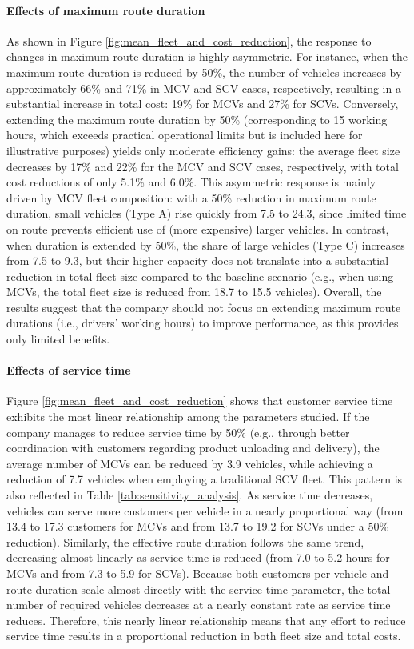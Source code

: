 \documentclass[11pt]{elsarticle}
\theoremstyle{plain}
\begin{document}
\paragraph{Effects of maximum route duration} 
As shown in Figure \ref{fig:mean_fleet_and_cost_reduction}, the response to changes in maximum route duration is highly asymmetric. For instance, when the maximum route duration is reduced by 50\%, the number of vehicles increases by approximately 66\% and 71\% in \ac{MCV} and \ac{SCV} cases, respectively, resulting in a substantial increase in total cost: 19\% for \acp{MCV} and 27\% for \acp{SCV}. Conversely, extending the maximum route duration by 50\% (corresponding to 15 working hours, which exceeds practical operational limits but is included here for illustrative purposes) yields only moderate efficiency gains: the average fleet size decreases by 17\% and 22\% for the \ac{MCV} and \ac{SCV} cases, respectively, with total cost reductions of only 5.1\% and 6.0\%.
This asymmetric response is mainly driven by \ac{MCV} fleet composition: with a 50\% reduction in maximum route duration, small vehicles (Type A) rise quickly from 7.5 to 24.3, since limited time on route prevents efficient use of (more expensive) larger vehicles. In contrast, when duration is extended by 50\%, the share of large vehicles (Type C) increases from 7.5 to 9.3, but their higher capacity does not translate into a substantial reduction in total fleet size compared to the baseline scenario (e.g., when using \acp{MCV}, the total fleet size is reduced from 18.7 to 15.5 vehicles).
Overall, the results suggest that the company should not focus on extending maximum route durations (i.e., drivers’ working hours) to improve performance, as this provides only limited benefits.

\paragraph{Effects of service time} Figure \ref{fig:mean_fleet_and_cost_reduction} shows that customer service time exhibits the most linear relationship among the parameters studied. If the company manages to reduce service time by 50\% (e.g., through better coordination with customers regarding product unloading and delivery), the average number of \acp{MCV} can be reduced by 3.9 vehicles, while achieving a reduction of 7.7 vehicles when employing a traditional \ac{SCV} fleet.
This pattern is also reflected in Table \ref{tab:sensitivity_analysis}. As service time decreases, vehicles can serve more customers per vehicle in a nearly proportional way (from 13.4 to 17.3 customers for \acp{MCV} and from 13.7 to 19.2 for \acp{SCV} under a 50\% reduction). Similarly, the effective route duration follows the same trend, decreasing almost linearly as service time is reduced (from 7.0 to 5.2 hours for \acp{MCV} and from 7.3 to 5.9 for \acp{SCV}). Because both customers-per-vehicle and route duration scale almost directly with the service time parameter, the total number of required vehicles decreases at a nearly constant rate as service time reduces.
Therefore, this nearly linear relationship means that any effort to reduce service time results in a proportional reduction in both fleet size and total costs.
\end{document}
